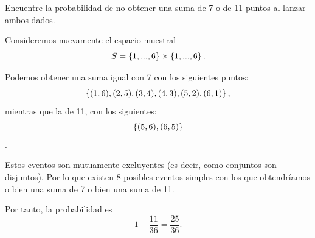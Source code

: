 \begin{problema}
	\label{problema:2.6}
	Encuentre la probabilidad de no obtener una suma de 7 o de 11 puntos al lanzar ambos dados.
\end{problema}


\begin{solucion}
	\label{solucion:2.6}
	Consideremos nuevamente el espacio muestral 
	\[
		S = \left\{ 1,...,6 \right\}\times\left\{ 1,...,6 \right\}.
	\]

	Podemos obtener una suma igual con 7 con los siguientes puntos:
	\[
		\left\{ (1,6),(2,5),(3,4),(4,3),(5,2),(6,1) \right\}, 
	\]
	mientras que la de 11, con los siguientes:
	\[\label{key}
		\left\{ (5,6), (6,5) \right\}
	\].

	Estos eventos son mutuamente excluyentes (es decir, como conjuntos son disjuntos). Por lo que existen 8 posibles eventos simples con los que obtendríamos o bien una suma de 7 o bien una suma de 11.
	
	Por tanto, la probabilidad es
	\[\label{key}
		1-\dfrac{11}{36}=\dfrac{25}{36}.
	\]
\end{solucion}